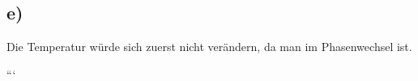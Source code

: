 

\subsection*{e)}
Die Temperatur würde sich zuerst nicht verändern, da man im Phasenwechsel ist.

```